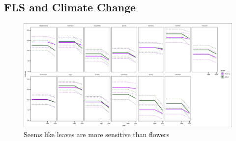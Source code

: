 \documentclass[12pt]{article}\usepackage[]{graphicx}\usepackage[]{color}
\begin{document}
\subsection*{FLS and Climate Change}    
    
   \begin{figure}[h!]
        \centering
         \includegraphics[width=\textwidth]{..//Plots/climchange.jpeg}
                 \caption{Seems like leaves are more sensitive than flowers}
    \end{figure}
\end{document}
